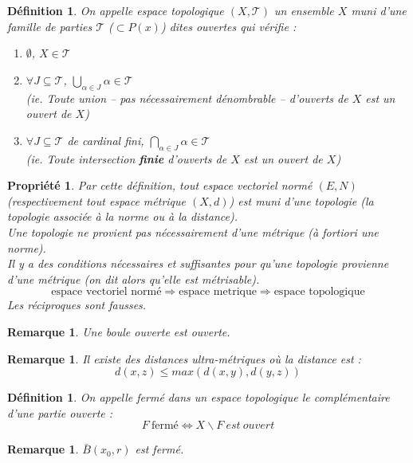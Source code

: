 \documentclass[a4paper, oneside]{report}
\theoremstyle{break}
\newtheorem{defi}[thm]{Définition}
\newtheorem{propr}[thm]{Propriété}
\newtheorem{remar}[thm]{Remarque}
\newcommand{\evn}{espace vectoriel normé }
\begin{document}
\begin{defi}                    
On appelle espace topologique $(X, \mathcal{T})$ un ensemble $X$ muni d'une famille de parties $\mathcal{T}$ ($\subset P(x)$) dites ouvertes qui vérifie :
\begin{enumerate}
\item $\emptyset$, $X\in \mathcal{T}$
\item $\forall J\subseteq \mathcal{T}$, $\bigcup_{\alpha \in J}\alpha \in \mathcal{T}$ \\
  (ie. Toute union -- pas nécessairement dénombrable -- d'ouverts de $X$ est un ouvert de $X$)
\item $\forall J \subseteq \mathcal{T}$ de cardinal fini, $\bigcap_{\alpha\in J}\alpha\in \mathcal{T}$ \\
  (ie. Toute intersection \textbf{finie} d'ouverts de $X$ est un ouvert de $X$)
\end{enumerate}
\end{defi}

\begin{propr}
Par cette définition, tout \evn $(E, N)$ (respectivement tout espace métrique $(X,d)$) est muni d'une topologie (la topologie associée à la norme ou à la distance).\\
Une topologie ne provient pas nécessairement d'une métrique (à fortiori une norme).\\
Il y a des conditions nécessaires et suffisantes pour qu'une topologie provienne d'une métrique (on dit alors qu'elle est métrisable).
$$ \text{espace vectoriel normé} \Rightarrow \text{espace metrique} \Rightarrow \text{espace topologique}$$
Les réciproques sont fausses.
\end{propr}

\begin{remar}
Une boule ouverte est ouverte.
\end{remar}


\begin{remar}
Il existe des distances ultra-métriques où la distance est :
$$d(x,z)\leq max(d(x,y),d(y,z))$$
\end{remar}


\begin{defi}                    
On appelle fermé dans un espace topologique le complémentaire d'une partie ouverte :
$$F~\text{fermé} \Leftrightarrow X\backslash F~est~ouvert$$
\end{defi}

\begin{remar}
$\bar{B}(x_0,r)$ est fermé.
\end{remar}
\end{document}
